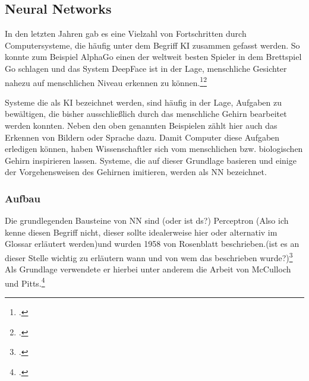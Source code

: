
\subsection{Neural Networks} \label{sec:NN}
In den letzten Jahren gab es eine Vielzahl von Fortschritten durch Computersysteme, die häufig unter dem Begriff \ac{KI} zusammen gefasst werden. So konnte zum Beispiel AlphaGo einen der weltweit besten Spieler in dem Brettspiel Go schlagen und das System DeepFace ist in der Lage, menschliche Gesichter nahezu auf menschlichen Niveau erkennen zu können.\footcites[Vgl.][]{spiegelGoogleComputerAlphaGo2016}\footcite[Vgl.][]{taigman2014deepface}

Systeme die als \ac{KI} bezeichnet werden, sind häufig in der Lage, Aufgaben zu bewältigen, die bisher ausschließlich durch das menschliche Gehirn bearbeitet werden konnten. Neben den oben genannten Beispielen zählt hier auch das Erkennen von Bildern oder Sprache dazu. Damit Computer diese Aufgaben erledigen können, haben Wissenschaftler sich vom menschlichen bzw. biologischen Gehirn inspirieren lassen. Systeme, die auf dieser Grundlage basieren und einige der Vorgehensweisen des Gehirnen imitieren, werden als \ac{NN} bezeichnet.

\subsubsection{Aufbau}
Die grundlegenden Bausteine von \ac{NN} sind (oder ist ds?) Perceptron (Also ich kenne diesen Begriff nicht, dieser sollte idealerweise hier oder alternativ im Glossar erläutert werden)und wurden 1958 von Rosenblatt beschrieben.(ist es an dieser Stelle wichtig zu erläutern wann und von wem das beschrieben wurde?)\footcite[Vgl.][]{rosenblattPerceptronProbabilisticModel1958} Als Grundlage verwendete er hierbei unter anderem die Arbeit von McCulloch und Pitts.\footcite[Vgl.][]{mccullochLogicalCalculusIdeas1943}



